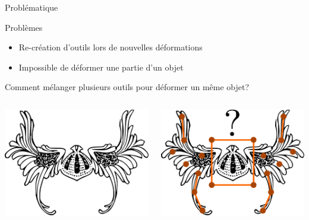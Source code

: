 \documentclass[xcolor=x11names,compress]{beamer}
\renewcommand{\(}{\begin{columns}} \renewcommand{\)}{\end{columns}}
\newcommand{\<}[1]{\begin{column}{#1}} \renewcommand{\>}{\end{column}}
\begin{document}
\begin{frame}{Problématique}
  \begin{alertblock}{Problèmes}
    \begin{itemize}
      \item Re-création d'outils lors de nouvelles déformations
      \item Impossible de déformer une partie d'un objet
    \end{itemize}
  \end{alertblock}
  \pause
  Comment mélanger plusieurs outils pour déformer un même objet? 
  \vspace{0.1in}
  \begin{columns}[t]
    \begin{column}{0.5\textwidth}
    \centering
      \includegraphics[scale=0.16]{Outil-Mono-Sans}
    \end{column}
    \pauses
    \begin{column}{0.5\textwidth}
    \centering
      \includegraphics[scale=0.16]{Outil-Multi}
    \end{column}
  \end{columns} 
\end{frame}
\end{document}

